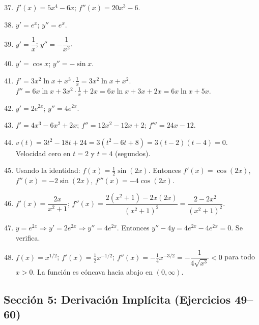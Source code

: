 \documentclass[12pt, a4paper]{article}
\begin{document}
\begin{enumerate}[leftmargin=*, label=\textbf{\arabic*.}]
  \setcounter{enumi}{36}
  \item $f'(x) = 5x^4 - 6x$; $f''(x) = 20x^3 - 6$.
  \item $y' = e^x$; $y'' = e^x$.
  \item $y' = \dfrac{1}{x}$; $y'' = -\dfrac{1}{x^2}$.
  \item $y' = \cos x$; $y'' = -\sin x$.
  \item $f' = 3x^2 \ln x + x^3 \cdot \frac{1}{x} = 3x^2 \ln x + x^2$. $f'' = 6x \ln x + 3x^2 \cdot \frac{1}{x} + 2x = 6x \ln x + 3x + 2x = 6x\ln x + 5x$.
  \item $y' = 2e^{2x}$; $y'' = 4e^{2x}$.
  \item $f' = 4x^3 - 6x^2 + 2x$; $f'' = 12x^2 - 12x + 2$; $f''' = 24x - 12$.
  \item $v(t) = 3t^2 - 18t + 24 = 3(t^2 - 6t + 8) = 3(t - 2)(t - 4) = 0$. Velocidad cero en $t = 2$ y $t = 4$ (segundos).
  \item Usando la identidad: $f(x) = \frac{1}{2}\sin(2x)$. Entonces $f'(x) = \cos(2x)$, $f''(x) = -2\sin(2x)$, $f'''(x) = -4\cos(2x)$.
  \item $f'(x) = \dfrac{2x}{x^2 + 1}$; $f''(x) = \dfrac{2(x^2 + 1) - 2x(2x)}{(x^2 + 1)^2} = \dfrac{2 - 2x^2}{(x^2 + 1)^2}$.
  \item $y = e^{2x} \Rightarrow y' = 2e^{2x} \Rightarrow y'' = 4e^{2x}$. Entonces $y'' - 4y = 4e^{2x} - 4e^{2x} = 0$. Se verifica.
  \item $f(x) = x^{1/2}$; $f'(x) = \frac{1}{2}x^{-1/2}$; $f''(x) = -\frac{1}{4}x^{-3/2} = -\dfrac{1}{4\sqrt{x^3}} < 0$ para todo $x > 0$. La función es cóncava hacia abajo en $(0, \infty)$.
\end{enumerate}

\newpage

\subsection*{Sección 5: Derivación Implícita (Ejercicios 49--60)}
\end{document}
